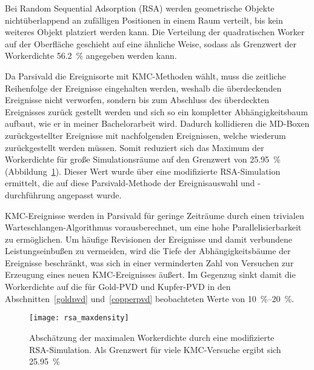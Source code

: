 Bei Random Sequential Adsorption (RSA) werden geometrische Objekte nichtüberlappend an zufälligen Positionen in einem Raum verteilt, bis kein weiteres Objekt platziert werden kann.
Die Verteilung der quadratischen Worker auf der Oberfläche geschieht auf eine ähnliche Weise, sodass als Grenzwert der Workerdichte \SI{56.2}{\percent}\cite{brosilow_random_1991} angegeben werden kann.

Da Parsivald die Ereignisorte mit KMC-Methoden wählt, muss die zeitliche Reihenfolge der Ereignisse eingehalten werden, weshalb die überdeckenden Ereignisse nicht verworfen, sondern bis zum Abschluss des überdeckten Ereignisses zurück gestellt werden und sich so ein kompletter Abhängigkeitsbaum aufbaut, wie er in meiner Bachelorarbeit wird\cite{lorenz_entwicklung_2012}.
Dadurch kollidieren die MD-Boxen zurückgestellter Ereignisse mit nachfolgenden Ereignissen, welche wiederum zurückgestellt werden müssen.
Somit reduziert sich das Maximum der Workerdichte für große Simulationsräume auf den Grenzwert von \SI{25.95}{\percent} (Abbildung~\ref{fig:rsamaxdensity}).
Dieser Wert wurde über eine modifizierte RSA-Simulation ermittelt, die auf diese Parsivald-Methode der Ereignisauswahl und -durchführung angepasst wurde.

KMC-Ereignisse werden in Parsivald für geringe Zeiträume durch einen trivialen Warte\-schlangen-Algorithmus vorausberechnet, um eine hohe Parallelisierbarkeit zu ermöglichen.
Um häufige Revisionen der Ereignisse und damit verbundene Leistungseinbußen zu vermeiden, wird die Tiefe der Abhängigkeitsbäume der Ereignisse beschränkt, was sich in einer verminderten Zahl von Versuchen zur Erzeugung eines neuen KMC-Ereignisses äußert.
Im Gegenzug sinkt damit die Workerdichte auf die für Gold-PVD und Kupfer-PVD in den Abschnitten~\ref{goldpvd} und~\ref{copperpvd} beobachteten Werte von \SIrange{10}{20}{\percent}.

\vspace{2em}

\begin{figure}[h]
  \centering
  \texttt{[image: rsa\_maxdensity]}

  \caption[Abschätzung der maximalen Workerdichte per RSA-Simulation]{
    Abschätzung der maximalen Workerdichte durch eine modifizierte RSA-Simulation.
    Als Grenzwert für viele KMC-Versuche ergibt sich \SI{25.95}{\percent}
  }
  \label{fig:rsamaxdensity}

\end{figure}
